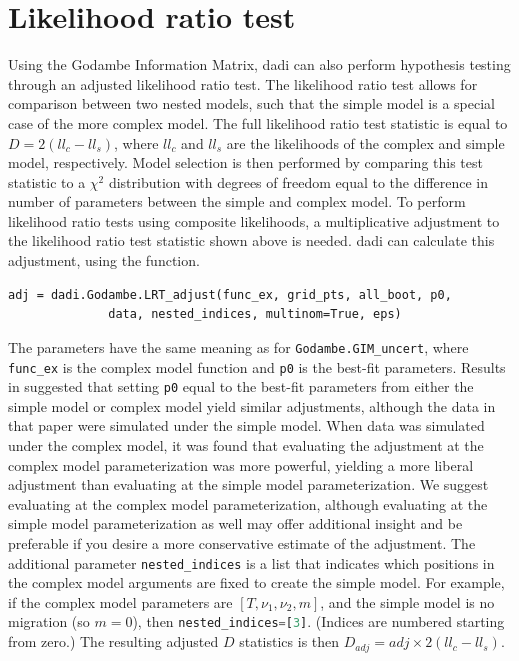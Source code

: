 \documentclass[12pt]{article}
\makeatletter
\newcommand{\dadi}{dadi\xspace}
\newcommand{\py}[1]{\lstinline[language=Python, showstringspaces=False]@#1@}
\makeatother
\begin{document}
\section{Likelihood ratio test}
Using the Godambe Information Matrix, \dadi can also perform hypothesis testing through an adjusted likelihood ratio test.
The likelihood ratio test allows for comparison between two nested models, such that the simple model is a special case of the more complex model.
The full likelihood ratio test statistic is equal to $D = 2(ll_{c}-ll_{s})$, where $ll_{c}$ and $ll_{s}$ are the likelihoods of the complex and simple model, respectively.
Model selection is then performed by comparing this test statistic to a $\chi^2$ distribution with degrees of freedom equal to the difference in number of parameters between the simple and complex model.
To perform likelihood ratio tests using composite likelihoods, a multiplicative adjustment to the likelihood ratio test statistic shown above is needed.
\dadi can calculate this adjustment, using the function.
\begin{lstlisting}
adj = dadi.Godambe.LRT_adjust(func_ex, grid_pts, all_boot, p0,
			  data, nested_indices, multinom=True, eps)
\end{lstlisting}
The parameters have the same meaning as for \py{Godambe.GIM_uncert}, where \py{func_ex} is the complex model function and \py{p0} is the best-fit parameters.
Results in \cite{Coffman2016} suggested that setting \py{p0} equal to the best-fit parameters from either the simple model or complex model yield similar adjustments, although the data in that paper were simulated under the simple model.
When data was simulated under the complex model, it was found that evaluating the adjustment at the complex model parameterization was more powerful, yielding a more liberal adjustment than evaluating at the simple model parameterization.
We suggest evaluating at the complex model parameterization, although evaluating at the simple model parameterization as well may offer additional insight and be preferable if you desire a more conservative estimate of the adjustment.
The additional parameter \py{nested_indices} is a list that indicates which positions in the complex model arguments are fixed to create the simple model.
For example, if the complex model parameters are $[T, \nu_1, \nu_2, m]$, and the simple model is no migration (so $m = 0$), then \py{nested_indices=[3]}.
(Indices are numbered starting from zero.)
The resulting adjusted $D$ statistics is then $D_{adj} = adj \times 2(ll_{c}-ll_{s})$.
\end{document}
